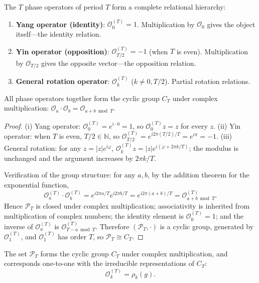 \begin{proposition}\label{prop:PPO_relation_structure}
The $T$ phase operators of period $T$ form a complete relational hierarchy:
\begin{enumerate}[label=(\roman*)]
    \item \textbf{Yang operator (identity)}: $\mathcal{O}_0^{(T)} = 1$. Multiplication by $\mathcal{O}_0$ gives the object itself---the identity relation.
    \item \textbf{Yin operator (opposition)}: $\mathcal{O}_{T/2}^{(T)} = -1$ (when $T$ is even). Multiplication by $\mathcal{O}_{T/2}$ gives the opposite vector---the opposition relation.
    \item \textbf{General rotation operator}: $\mathcal{O}_k^{(T)}$ ($k \neq 0, T/2$). Partial rotation relations.
\end{enumerate}
All phase operators together form the cyclic group $C_T$ under complex multiplication: $\mathcal{O}_a \cdot \mathcal{O}_b = \mathcal{O}_{a+b \bmod T}$.
\end{proposition}

\begin{proof}
(i) Yang operator: $\mathcal{O}_0^{(T)} = e^{i\cdot 0} = 1$, so $\mathcal{O}_0^{(T)} z = z$ for every $z$. (ii) Yin operator: when $T$ is even, $T/2 \in \mathbb{N}$, so $\mathcal{O}_{T/2}^{(T)} = e^{i2\pi(T/2)/T} = e^{i\pi} = -1$. (iii) General rotation: for any $z = |z|e^{i\varphi}$, $\mathcal{O}_k^{(T)} z = |z| e^{i(\varphi + 2\pi k/T)}$; the modulus is unchanged and the argument increases by $2\pi k/T$.

Verification of the group structure: for any $a,b$, by the addition theorem for the exponential function,
\[
\mathcal{O}_a^{(T)} \cdot \mathcal{O}_b^{(T)} = e^{i2\pi a/T} e^{i2\pi b/T} = e^{i2\pi(a+b)/T} = \mathcal{O}_{a+b \bmod T}^{(T)}.
\]
Hence $\mathcal{P}_T$ is closed under complex multiplication; associativity is inherited from multiplication of complex numbers; the identity element is $\mathcal{O}_0^{(T)} = 1$; and the inverse of $\mathcal{O}_a^{(T)}$ is $\mathcal{O}_{T-a \bmod T}^{(T)}$. Therefore $(\mathcal{P}_T, \cdot)$ is a cyclic group, generated by $\mathcal{O}_1^{(T)}$, and $\mathcal{O}_1^{(T)}$ has order $T$, so $\mathcal{P}_T \cong C_T$.
\end{proof}

\begin{proposition}\label{prop:PPO_group_yijing}
The set $\mathcal{P}_T$ forms the cyclic group $C_T$ under complex multiplication, and corresponds one-to-one with the irreducible representations of $C_T$:
\[
\mathcal{O}_k^{(T)} = \rho_k(g).
\]
\end{proposition}

